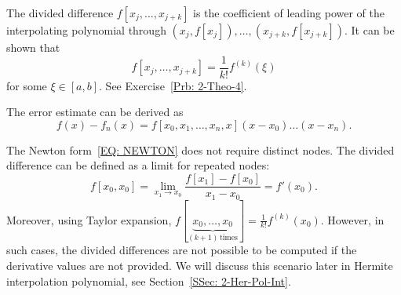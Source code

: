 \begin{remark}
    The divided difference $f[x_j, \dots, x_{j+k}]$ is the coefficient of leading power of the interpolating polynomial through $(x_j, f[x_j]), \dots, (x_{j+k}, f[x_{j+k}])$. It can be shown that 
    $$f[x_j, \dots, x_{j+k}] = \frac{1}{k!}f^{(k)}(\xi)$$
    for some $\xi\in [a, b]$. See Exercise~\ref{Prb: 2-Theo-4}.
\end{remark}
\begin{remark}
\label{Rem: 2-New-err}
    The error estimate can be derived as 
    \begin{equation}
        f(x) - f_n(x) = f[x_0, x_1, \dots, x_n, x] (x-x_0)\dots (x - x_n).
    \end{equation}
\end{remark}
\begin{remark}
    The Newton form~\eqref{EQ: NEWTON} does not require distinct nodes. The divided difference can be defined as a limit for repeated nodes:
    \begin{equation}
        f[x_0, x_0] = \lim_{x_1 \to x_0} \frac{f[x_1] - f[x_0]}{x_1 - x_0} = f'(x_0).
    \end{equation}
    Moreover, using Taylor expansion, $f[\underbrace{x_0,\dots, x_0}_{(k+1)\,\text{times}}] = \frac{1}{k!}f^{(k)}(x_0)$. However, in such cases, the divided differences are not possible to be computed if the derivative values are not provided. We will discuss this scenario later in Hermite interpolation polynomial, see Section~\ref{SSec: 2-Her-Pol-Int}.
\end{remark}
